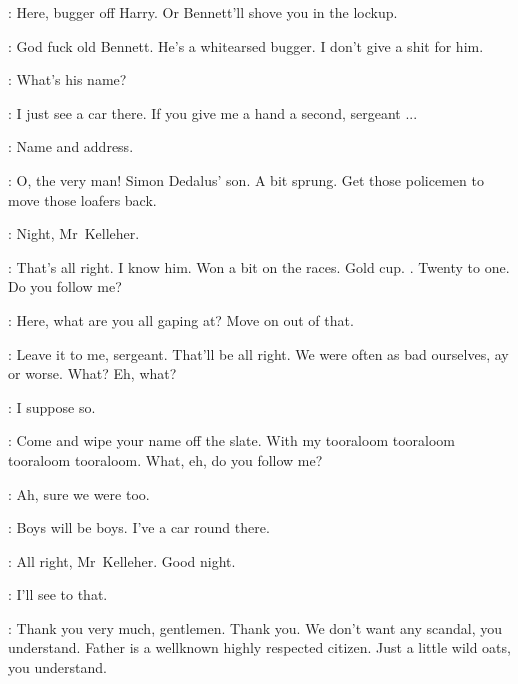 \Compton:
Here, bugger off Harry.
Or Bennett'll shove you in the lockup.

\Carr:
God fuck old Bennett.
He's a white\-arsed bugger.
I don't give a shit for him.

\FirstWatch:
What's his name?

\Bloom:
I just see a car there.
If you give me a hand a second, sergeant ...

\FirstWatch:
Name and address.


\Bloom:
O, the very man!
Simon Dedalus' son.
A bit sprung.
Get those policemen to move those loafers back.

\SecondWatch:
Night, Mr~Kelleher.

\Corny:
That's all right.
I know him.
Won a bit on the races.
Gold cup.
.
Twenty to one.
Do you follow me?

\FirstWatch:
Here, what are you all gaping at?
Move on out of that.


\Corny:
Leave it to me, sergeant.
That'll be all right.
We were often as bad ourselves, ay or worse.
What? Eh, what?

\FirstWatch:
I suppose so.

\Corny:
Come and wipe your name off the slate.
With my tooraloom tooraloom tooraloom tooraloom.
What, eh, do you follow me?

\SecondWatch:
Ah, sure we were too.

\Corny:
Boys will be boys.
I've a car round there.

\SecondWatch:
All right, Mr~Kelleher.
Good night.

\Corny:
I'll see to that.

\Bloom:
Thank you very much, gentlemen.
Thank you.
We don't want any scandal, you understand.
Father is a wellknown highly respected citizen.
Just a little wild oats, you understand.

